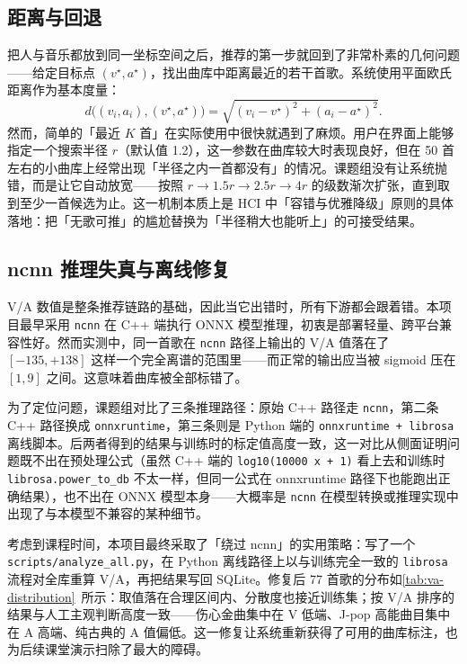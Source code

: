 \subsection{距离与回退}

把人与音乐都放到同一坐标空间之后，推荐的第一步就回到了非常朴素的几何问题——给定目标点 $(v^\star, a^\star)$，找出曲库中距离最近的若干首歌。系统使用平面欧氏距离作为基本度量：
\begin{equation}\label{eq:dist}
  d\bigl((v_i, a_i), (v^\star, a^\star)\bigr) = \sqrt{(v_i - v^\star)^2 + (a_i - a^\star)^2}.
\end{equation}
然而，简单的「最近 $K$ 首」在实际使用中很快就遇到了麻烦。用户在界面上能够指定一个搜索半径 $r$（默认值 1.2），这一参数在曲库较大时表现良好，但在 50 首左右的小曲库上经常出现「半径之内一首都没有」的情况。课题组没有让系统抛错，而是让它自动放宽——按照 $r \rightarrow 1.5r \rightarrow 2.5r \rightarrow 4r$ 的级数渐次扩张，直到取到至少一首候选为止。这一机制本质上是 HCI 中「容错与优雅降级」原则的具体落地：把「无歌可推」的尴尬替换为「半径稍大也能听上」的可接受结果。

\subsection{ncnn 推理失真与离线修复}

V/A 数值是整条推荐链路的基础，因此当它出错时，所有下游都会跟着错。本项目最早采用 \texttt{ncnn} 在 C++ 端执行 ONNX 模型推理，初衷是部署轻量、跨平台兼容性好。然而实测中，同一首歌在 \texttt{ncnn} 路径上输出的 V/A 值落在了 $[-135, +138]$ 这样一个完全离谱的范围里——而正常的输出应当被 sigmoid 压在 $[1, 9]$ 之间。这意味着曲库被全部标错了。

为了定位问题，课题组对比了三条推理路径：原始 C++ 路径走 \texttt{ncnn}，第二条 C++ 路径换成 \texttt{onnxruntime}，第三条则是 Python 端的 \texttt{onnxruntime + librosa} 离线脚本。后两者得到的结果与训练时的标定值高度一致，这一对比从侧面证明问题既不出在预处理公式（虽然 C++ 端的 \texttt{log10(10000 x + 1)} 看上去和训练时 \texttt{librosa.power\_to\_db} 不太一样，但同一公式在 onnxruntime 路径下也能跑出正确结果），也不出在 ONNX 模型本身——大概率是 \texttt{ncnn} 在模型转换或推理实现中出现了与本模型不兼容的某种细节。

考虑到课程时间，本项目最终采取了「绕过 ncnn」的实用策略：写了一个 \texttt{scripts/analyze\_all.py}，在 Python 离线路径上以与训练完全一致的 \texttt{librosa} 流程对全库重算 V/A，再把结果写回 SQLite。修复后 77 首歌的分布如\cref{tab:va-distribution}~所示：取值落在合理区间内、分散度也接近训练集；按 V/A 排序的结果与人工主观判断高度一致——伤心金曲集中在 V 低端、J-pop 高能曲目集中在 A 高端、纯古典的 A 值偏低。这一修复让系统重新获得了可用的曲库标注，也为后续课堂演示扫除了最大的障碍。

